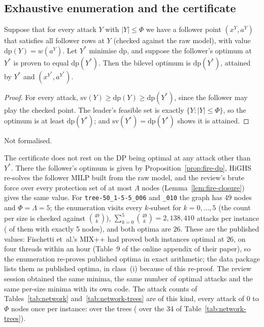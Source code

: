 \subsection{Exhaustive enumeration and the certificate}

\begin{theorem}\label{thm:fire-cert}
Suppose that for every attack $Y$ with $|Y|\le\Phi$ we have a follower point
$(x^Y,a^Y)$ that satisfies all follower rows at $Y$ (checked against the raw
model), with value $\mathrm{dp}(Y)=w(a^Y)$. Let $Y^{*}$ minimise $\mathrm{dp}$, and
suppose the follower's optimum at $Y^{*}$ is proven to equal $\mathrm{dp}(Y^{*})$.
Then the bilevel optimum is $\mathrm{dp}(Y^{*})$, attained by $Y^{*}$ and
$(x^{Y^{*}},a^{Y^{*}})$.
\end{theorem}
\begin{proof}
For every attack, $\mathrm{sv}(Y)\ge\mathrm{dp}(Y)\ge\mathrm{dp}(Y^{*})$, since the
follower may play the checked point. The leader's feasible set is exactly
$\{Y:|Y|\le\Phi\}$, so the optimum is at least $\mathrm{dp}(Y^{*})$; and
$\mathrm{sv}(Y^{*})=\mathrm{dp}(Y^{*})$ shows it is attained.
\end{proof}
\noindent Not formalised.

The certificate does not rest on the DP being optimal at any attack other
than $Y^{*}$. There the follower's optimum is given by
Proposition~\ref{prop:fire-dp}, HiGHS re-solves the follower MILP built from the raw
model, and the review's brute force over every protection set of at most
$\Lambda$ nodes (Lemma~\ref{lem:fire-closure}) gives the same value. For
\texttt{tree-50\_1-5-5\_006} and \texttt{\_010} the graph has 49
nodes and $\Phi=\Lambda=5$; the enumeration visits every $k$-subset for
$k=0,\dots,5$ (the count per size is checked against $\binom{49}k$),
$\sum_{k=0}^5\binom{49}k=2{,}138{,}410$ attacks per instance
(\SuppNetFullBudgetAttacks{} of them with exactly 5 nodes), and both optima are
$26$. These are the published values: Fischetti et~al.'s MIX++ had proved both
instances optimal at $26$, on four threads within an hour (Table~9 of the online
appendix of their paper),\cite{fischetti2017new,fischetti2016appendix} so the
enumeration re-proves published optima in exact arithmetic; the data package
lists them as published optima, in class~(i) because of this re-proof. The review session obtained the same minima, the same number of optimal
attacks and the same per-size minima with its own code. The attack counts of
Tables~\ref{tab:network} and~\ref{tab:network-trees} are of this kind, every
attack of $0$ to $\Phi$ nodes once per instance: \SuppNetTreeAttacks{} over the
\SuppNetTrees{} trees (\SuppNetTableTreeAttacks{} over the 34 of
Table~\ref{tab:network-trees}).


